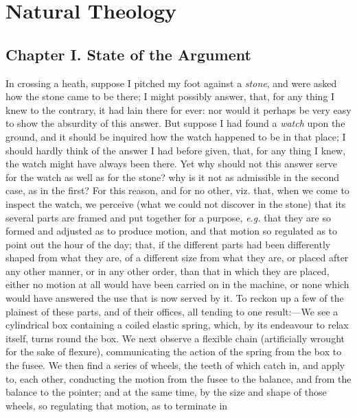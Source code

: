 
\author{William Paley}
\chapter[Natural Theology, chaps. 1 and 2]{Natural Theology}

\section*{Chapter I. State of the Argument}

In crossing a heath, suppose I pitched my foot against a
\textit{stone}, and were asked how the stone came to be there; I might
possibly answer, that, for any thing I knew to the contrary, it had
lain there for ever: nor would it perhaps be very easy to show the
absurdity of this answer. But suppose I had found a \textit{watch}
upon the ground, and it should be inquired how the watch happened to
be in that place; I should hardly think of the answer I had before
given, that, for any thing I knew, the watch might have always been
there. Yet why should not this answer serve for the watch as well as
for the stone? why is it not as admissible in the second case, as in
the first? For this reason,  and for no other, viz. that, when
we come to inspect the watch, we perceive (what we could not discover
in the stone) that its several parts are framed and put together for a
purpose, \textit{e.g.} that they are so formed and adjusted as to
produce motion, and that motion so regulated as to point out the hour
of the day; that, if the different parts had been differently shaped
from what they are, of a different size from what they are, or placed
after any other manner, or in any other order, than that in which they
are placed, either no motion at all would have been carried on in the
machine, or none which would have answered the use that is now served
by it. To reckon up a few of the plainest of these parts, and of their
offices, all tending to one re\-sult:---We see a cylindrical box
containing a coiled elastic spring, which, by its endeavour to relax
itself, turns round the box. We next observe a flexible chain
(artificially wrought for the sake of flexure), communicating the
action of the spring from the box to the fusee. We then find a series
of wheels, the teeth of which catch in, and apply to, each other,
conducting the motion from the fusee to the balance, and from the
balance to the pointer; and at the same time, by the  size and
shape of those wheels, so regulating that motion, as to terminate in
